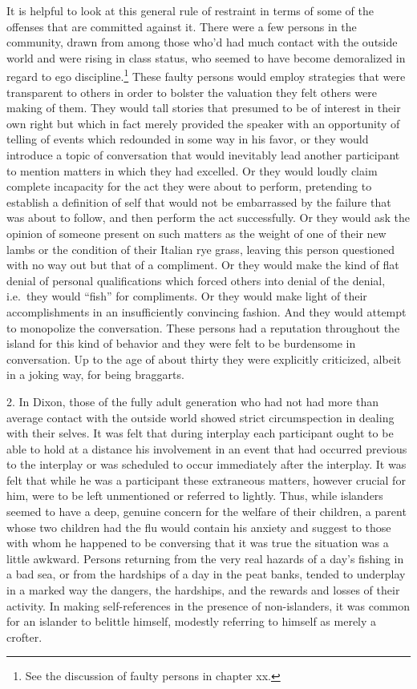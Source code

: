 \documentclass[openany,nobib]{tufte-book}
\begin{document}
It is helpful to look at this general rule of restraint in terms of some
of the offenses that are committed against it. There were a few persons
in the community, drawn from among those who'd had much contact with the
outside world and were rising in class status, who seemed to have become
demoralized in regard to ego discipline.\footnote{See the discussion of
  faulty persons in chapter xx.} These faulty persons would employ
strategies that were transparent to others in order to bolster the
valuation they felt others were making of them. They would tall stories
that presumed to be of interest in their own right but which in fact
merely provided the speaker with an opportunity of telling of events
which redounded in some way in his favor, or they would introduce a
topic of conversation that would inevitably lead another participant to
mention matters in which they had excelled. Or they would loudly claim
complete incapacity for the act they were about to perform, pretending
to establish a definition of self that would not be embarrassed by the
failure that was about to follow, and then perform the act successfully.
Or they would ask the opinion of someone present on such matters as the
weight of one of their new lambs or the condition of their Italian rye
grass, leaving this person questioned with no way out but that of a
compliment. Or they would make the kind of flat denial of personal
qualifications which forced others into denial of the denial, i.e.~they
would ``fish'' for compliments. Or they would make light of their
accomplishments in an insufficiently convincing fashion. And they would
attempt to monopolize the conversation. These persons had a reputation
throughout the island for this kind of behavior and they were felt to be
burdensome in conversation. Up to the age of about thirty they were
explicitly criticized, albeit in a joking way, for being braggarts.

2. In Dixon, those of the fully adult generation who had not had more
than average contact with the outside world showed strict circumspection
in dealing with their selves. It was felt that during interplay each
participant ought to be able to hold at a distance his involvement in an
event that had occurred previous to the interplay or was scheduled to
occur immediately after the interplay. It was felt that while he was a
participant these extraneous matters, however crucial for him, were to
be left unmentioned or referred to lightly. Thus, while islanders seemed
to have a deep, genuine concern for the welfare of their children, a
parent whose two children had the flu would contain his anxiety and
suggest to those with whom he happened to be conversing that it was true
the situation was a little awkward. Persons returning from the very real
hazards of a day's fishing in a bad sea, or from the hardships of a day
in the peat banks, tended to underplay in a marked way the dangers, the
hardships, and the rewards and losses of their activity. In making
self-references in the presence of non-islanders, it was common for an
islander to belittle himself, modestly referring to himself as merely a
crofter.
\end{document}
